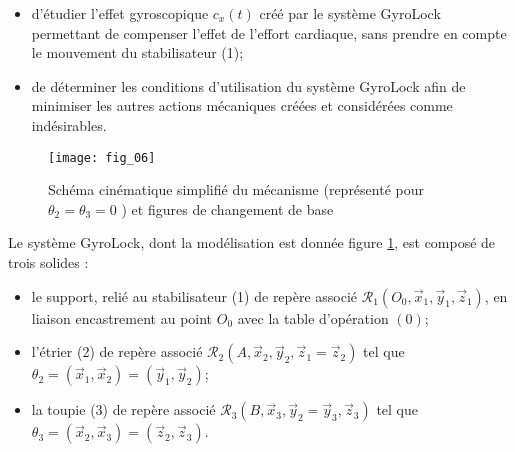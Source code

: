 \begin{itemize}
  \item d'étudier l'effet gyroscopique $c_{x}(t)$ créé par le système GyroLock permettant de compenser l'effet de l'effort cardiaque, sans prendre en compte le mouvement du stabilisateur (1);

  \item de déterminer les conditions d'utilisation du système GyroLock afin de minimiser les autres actions mécaniques créées et considérées comme indésirables.
\end{itemize}


\begin{figure}[!h]
\centering
\texttt{[image: fig\_06]}
\caption{\label{fig:06}Schéma cinématique simplifié du mécanisme (représenté pour $\theta_{2}=\theta_{3}=0$ ) et figures de changement de base}
\end{figure}


Le système GyroLock, dont la modélisation est donnée figure \ref{fig:06}, est composé de trois solides :

\begin{itemize}
  \item le support, relié au stabilisateur (1) de repère associé $\mathcal{R}_{1}\left(O_{0}, \vec{x}_{1}, \vec{y}_{1}, \vec{z}_{1}\right)$, en liaison encastrement au point $O_{0}$ avec la table d'opération $(0)$;

  \item l'étrier (2) de repère associé $\mathcal{R}_{2}\left(A, \vec{x}_{2}, \vec{y}_{2}, \vec{z}_{1}=\vec{z}_{2}\right)$ tel que $\theta_{2}=\left(\vec{x}_{1}, \vec{x}_{2}\right)=\left(\vec{y}_{1}, \vec{y}_{2}\right)$;

  \item la toupie (3) de repère associé $\mathcal{R}_{3}\left(B, \vec{x}_{3}, \vec{y}_{2}=\vec{y}_{3}, \vec{z}_{3}\right)$ tel que $\theta_{3}=\left(\vec{x}_{2}, \vec{x}_{3}\right)=\left(\vec{z}_{2}, \vec{z}_{3}\right)$.

\end{itemize}

